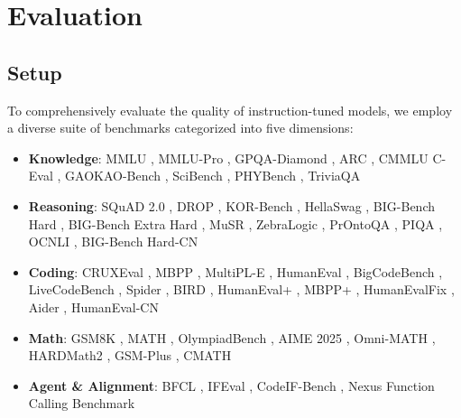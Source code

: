 \renewcommand{\thesubfigure}{\alph{subfigure}}
\section{Evaluation}
\subsection{Setup}
To comprehensively evaluate the quality of instruction-tuned models, we employ a diverse suite of benchmarks categorized into five dimensions:

\begin{itemize}
    \item \textbf{Knowledge}: MMLU \citep{hendrycks2020mmlu}, MMLU-Pro \citep{wang2024mmlupro}, GPQA-Diamond \citep{rein2024gpqa}, ARC \citep{clark2018think}, CMMLU \citep{li2023cmmlu} C-Eval \citep{huang2023ceval}, GAOKAO-Bench \citep{zhang2023evaluating}, SciBench \citep{wang2023scibench}, PHYBench \citep{qiu2025phybench}, TriviaQA \citep{joshi2017triviaqa}
    \item \textbf{Reasoning}: SQuAD 2.0 \citep{rajpurkar2018know}, DROP \citep{dua2019drop}, KOR-Bench \citep{ma2024kor}, HellaSwag \citep{zellers2019hellaswag}, BIG-Bench Hard \citep{suzgun2023challenging}, BIG-Bench Extra Hard \citep{kazemi2025big}, MuSR \citep{sprague2023musr}, ZebraLogic \citep{lin2025zebralogic}, PrOntoQA \citep{saparov2022language}, PIQA \citep{bisk2020piqa}, OCNLI \citep{hu2020ocnli}, BIG-Bench Hard-CN \citep{opencompass}
    \item \textbf{Coding}: CRUXEval \citep{gu2024cruxeval}, MBPP \citep{austin2021program}, MultiPL-E \citep{cassano2023multiple}, HumanEval \citep{chen2021evaluating}, BigCodeBench \citep{zhuo2024bigcodebench}, LiveCodeBench \citep{jain2024livecodebench}, Spider \citep{yu2018spider}, BIRD \citep{li2023can}, HumanEval+ \citep{liu2023your}, MBPP+ \citep{liu2023your}, HumanEvalFix \citep{muennighoff2023octopack}, Aider \citep{aider}, HumanEval-CN \citep{opencompass}
    \item \textbf{Math}: GSM8K \citep{cobbe2021gsm8k}, MATH \citep{hendrycks2021math}, OlympiadBench \citep{he2024olympiadbench}, AIME 2025 \citep{aime2025aime}, Omni-MATH \citep{gao2024omni}, HARDMath2 \citep{roggeveen2025hardmath2}, GSM-Plus \citep{li2024gsm}, CMATH \citep{wei2023cmath}
    \item \textbf{Agent \& Alignment}: BFCL \citep{patil2025bfcl}, IFEval \citep{zhou2023ifeval}, CodeIF-Bench \citep{wang2025codeif}, Nexus Function Calling Benchmark \citep{nexusraven}
\end{itemize}

